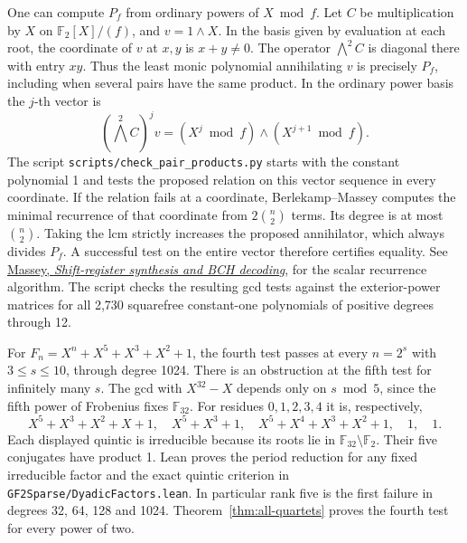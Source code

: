 \documentclass[11pt]{article}
\newcommand{\F}{\mathbb F_2}
\begin{document}
One can compute \(P_f\) from ordinary powers of \(X\bmod f\).
Let \(C\) be multiplication by \(X\) on \(\F[X]/(f)\), and
\(v=1\wedge X\). In the basis given by evaluation at each root,
the coordinate of \(v\) at \(x,y\) is \(x+y\ne0\). The operator
\(\bigwedge^2 C\) is diagonal there with entry \(xy\). Thus the
least monic polynomial annihilating \(v\) is precisely \(P_f\),
including when several pairs have the same product.
In the ordinary power basis the \(j\)-th vector is
\[
          (\textstyle\bigwedge^2 C)^j v =
               (X^j\bmod f)\wedge (X^{j+1}\bmod f).
\]
The script \texttt{scripts/check\_pair\_products.py} starts with
the constant polynomial 1 and tests the proposed relation on this vector
sequence in every coordinate. If the relation fails at a coordinate,
Berlekamp--Massey computes the minimal recurrence of that coordinate
from \(2\binom n2\) terms. Its degree is at most \(\binom n2\).
Taking the lcm strictly increases the proposed annihilator, which
always divides \(P_f\). A successful test on the entire vector therefore
certifies equality. See
\href{https://doi.org/10.1109/TIT.1969.1054260}{Massey, \emph{Shift-register
synthesis and BCH decoding}}, for the scalar recurrence algorithm.
The script checks the resulting gcd tests against
the exterior-power matrices for all 2,730 squarefree constant-one
polynomials of positive degrees through 12.

For \(F_n=X^n+X^5+X^3+X^2+1\), the fourth test passes at every
\(n=2^s\) with \(3\le s\le10\), through degree 1024.
There is an obstruction at the fifth test for infinitely many \(s\).
The gcd with \(X^{32}-X\) depends only on \(s\bmod5\), since
the fifth power of Frobenius fixes \(\mathbb F_{32}\). For residues
\(0,1,2,3,4\) it is, respectively,
\[
 X^5+X^3+X^2+X+1,\quad X^5+X^3+1,\quad
 X^5+X^4+X^3+X^2+1,\quad 1,\quad 1 .
\]
Each displayed quintic is irreducible because its roots lie in
\(\mathbb F_{32}\setminus\F\). Their five conjugates have product 1.
Lean proves the period reduction for any fixed irreducible factor and
the exact quintic criterion in \texttt{GF2Sparse/DyadicFactors.lean}.
In particular rank five is the first failure in degrees 32, 64, 128
and 1024. Theorem~\ref{thm:all-quartets} proves the fourth test for every power of two.
\end{document}
